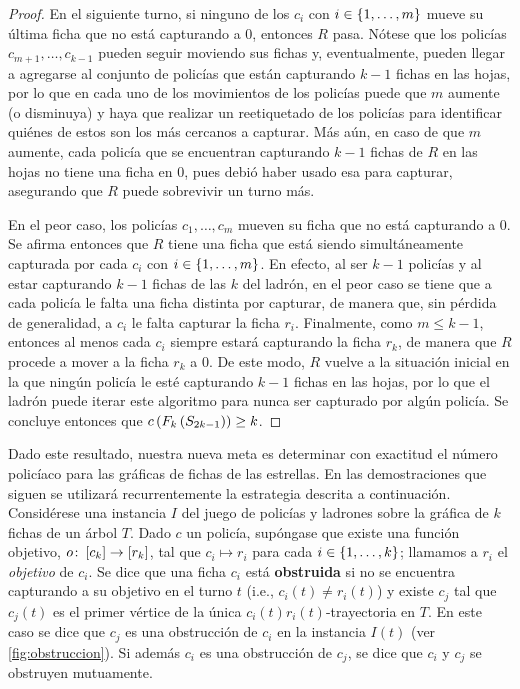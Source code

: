 \begin{proof}
    En el siguiente turno, si ninguno de los $c_{i}$ con $i\in\{1,\dots, m\}$ mueve
    su \'ultima ficha que no est\'a capturando a $0$, entonces $R$ pasa.
    N\'otese que los polic\'ias $c_{m+1},\dots,c_{{k-1}}$ pueden seguir moviendo
    sus fichas y, eventualmente, pueden llegar a agregarse al conjunto de
    polic\'ias que est\'an capturando $k-1$ fichas en las hojas, por lo que en
    cada uno de los movimientos de los polic\'ias puede que $m$ aumente (o
    disminuya) y haya que realizar un reetiquetado de los polic\'ias para
    identificar qui\'enes de estos son los m\'as cercanos a capturar. M\'as
    a\'un, en caso de que $m$ aumente, cada polic\'ia que se encuentran
    capturando $k-1$ fichas de $R$ en las hojas no tiene una ficha en $0$, pues
    debi\'o haber usado esa para capturar, asegurando que $R$ puede sobrevivir
    un turno m\'as.

    En el peor caso, los polic\'ias $c_1,\dots, c_m$ mueven su ficha que no
    est\'a capturando a $0$. Se afirma entonces que $R$ tiene una ficha que
    est\'a siendo simult\'aneamente capturada por cada $c_{i}$ con $i\in
    \{1,\dots, m\}$. En efecto, al ser $k-1$ polic\'ias y al estar capturando $k-1$
    fichas de las $k$ del ladr\'on, en el peor caso se tiene que a cada
    polic\'ia le falta una ficha distinta por capturar, de manera que, sin
    p\'erdida de generalidad, a $c_{i}$ le falta capturar la ficha $r_i$.
    Finalmente, como $m\leq k-1$, entonces al menos cada $c_{i}$ siempre
    estar\'a capturando la ficha $r_k$, de manera que $R$ procede a mover a la
    ficha $r_k$ a $0$. De este modo, $R$ vuelve a la situaci\'on inicial en la
    que ning\'un polic\'ia le est\'e capturando $k-1$ fichas en las hojas, por
    lo que el ladr\'on puede iterar este algoritmo para nunca ser capturado por
    alg\'un polic\'ia. Se concluye entonces que $c\left( F_{k}\left( S_{2k-1}\right)\right) \ge
    k$.
    
\end{proof}

Dado este resultado, nuestra nueva meta es determinar con exactitud el n\'umero
polic\'iaco para las gr\'aficas de fichas de las estrellas. En las
demostraciones que siguen se utilizar\'a recurrentemente la estrategia descrita
a continuaci\'on. Consid\'erese una instancia $I$ del juego de polic\'ias y
ladrones sobre la gr\'afica de $k$ fichas de un \'arbol $T$. Dado $c$ un
polic\'ia, sup\'ongase que existe una funci\'on objetivo, $o \colon \left[ c_k\right]\to
\left[ r_k\right]$, tal que $c_i\mapsto r_i$ para cada $i\in\{1,\dots, k\}$; llamamos a $r_i$
el \textit{objetivo} de $c_i$. Se dice que una ficha $c_i$ est\'a
\textbf{obstruida} si no se encuentra capturando a su objetivo en el turno $t$
(i.e., $c_i(t)\neq r_i(t)$) y existe $c_j$ tal que $c_j(t)$ es el primer
v\'ertice de la \'unica $c_i(t)r_i(t)$-trayectoria en $T$. En este caso se dice
que $c_j$ es una obstrucci\'on de $c_i$ en la instancia $I(t)$ (ver
\cref{fig:obstruccion}). Si adem\'as $c_i$ es una obstrucci\'on de $c_j$, se
dice que $c_i$ y $c_j$ se obstruyen mutuamente.

